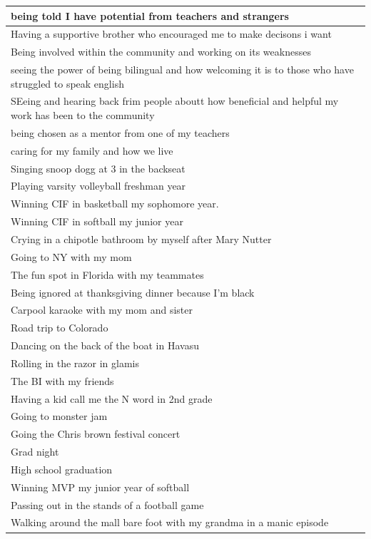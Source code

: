 \documentclass[
  .7em,
  letterpaper,
  DIV=11,
  numbers=noendperiod]{scrartcl}
\begin{document}
\begin{table}
\begin{tabular}{l}
\hline
being told I have potential from teachers and strangers\\
\hline
Having a supportive brother who encouraged me to make decisons i want\\
\hline
Being involved within the community and working on its weaknesses\\
\hline
seeing the power of being bilingual and how welcoming it is to those who have struggled to speak english\\
\hline
SEeing and hearing back frim people aboutt how beneficial and helpful my work has been to the community\\
\hline
being chosen as a mentor from one of my teachers\\
\hline
caring for my family and how we live\\
\hline
Singing snoop dogg at 3 in the backseat\\
\hline
Playing varsity volleyball freshman year\\
\hline
Winning CIF in basketball my sophomore year.\\
\hline
Winning CIF in softball my junior year\\
\hline
Crying in a chipotle bathroom by myself after Mary Nutter\\
\hline
Going to NY with my mom\\
\hline
The fun spot in Florida with my teammates\\
\hline
Being ignored at thanksgiving dinner because I’m black\\
\hline
Carpool karaoke with my mom and sister\\
\hline
Road trip to Colorado\\
\hline
Dancing on the back of the boat in Havasu\\
\hline
Rolling in the razor in glamis\\
\hline
The BI with my friends\\
\hline
Having a kid call me the N word in 2nd grade\\
\hline
Going to monster jam\\
\hline
Going the Chris brown festival concert\\
\hline
Grad night\\
\hline
High school graduation\\
\hline
Winning MVP my junior year of softball\\
\hline
Passing out in the stands of a football game\\
\hline
Walking around the mall bare foot with my grandma in a manic episode\\

\end{tabular}
\end{table}
\end{document}
